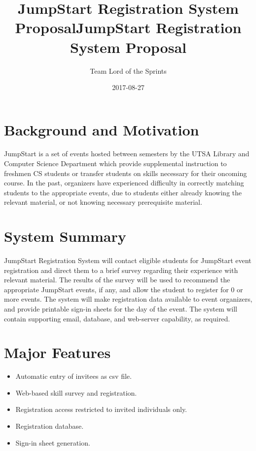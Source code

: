 \documentclass[a4paper]{article}
\title{JumpStart Registration System Proposal}
\begin{document}
\title{JumpStart Registration System Proposal}
\author{Team Lord of the Sprints}
\date{2017-08-27}
\maketitle

\section{Background and Motivation}
\paragraph{} JumpStart is a set of events hosted between semesters by the UTSA Library and Computer Science Department which provide supplemental instruction to freshmen CS students or transfer students on skills necessary for their oncoming course. In the past, organizers have experienced difficulty in correctly matching students to the appropriate events, due to students either already knowing the relevant material, or not knowing necessary prerequisite material.

\section{System Summary}
\paragraph{} JumpStart Registration System will contact eligible students for JumpStart event registration and direct them to a brief survey regarding their experience with relevant material. The results of the survey will be used to recommend the appropriate JumpStart events, if any, and allow the student to register for 0 or more events. The system will make registration data available to event organizers, and provide printable sign-in sheets for the day of the event. The system will contain supporting email, database, and web-server capability, as required.

\section{Major Features}
	\begin{itemize}
		\item Automatic entry of invitees as csv file.
		\item Web-based skill survey and registration.
		\item Registration access restricted to invited individuals only.
		\item Registration database.
		\item Sign-in sheet generation.
	\end{itemize}
\end{document}
